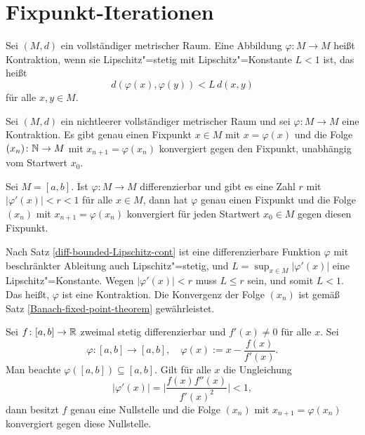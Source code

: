 \newpage
\section{Fixpunkt-Iterationen}%

\begin{Definition}[Kontraktion]
Sei $(M,d)$ ein vollständiger metrischer Raum. Eine Abbildung
$\varphi\colon M\to M$ heißt Kontraktion, wenn sie
Lipschitz"=stetig mit Lipschitz"=Konstante $L<1$ ist, das heißt
\[d(\varphi(x),\varphi(y))<L\,d(x,y)\]
für alle $x,y\in M$.
\end{Definition}

\begin{Satz}\label{Banach-fixed-point-theorem}%
Sei $(M,d)$ ein nichtleerer vollständiger metrischer Raum
und sei $\varphi\colon M\to M$ eine Kontraktion. Es gibt genau
einen Fixpunkt $x\in M$ mit $x=\varphi(x)$ und die Folge
$(x_n)\colon\mathbb N\to M$ mit $x_{n+1}=\varphi(x_n)$ konvergiert
gegen den Fixpunkt, unabhängig vom Startwert $x_0$.
\end{Satz}

\begin{Satz}\label{diff-fixed-point-iter}
Sei $M=[a,b]$. Ist $\varphi\colon M\to M$ differenzierbar und gibt es
eine Zahl $r$ mit $|\varphi'(x)|<r<1$ für alle $x\in M$, dann
hat $\varphi$ genau einen Fixpunkt und die Folge $(x_n)$ mit $x_{n+1}=\varphi(x_n)$
konvergiert für jeden Startwert $x_0\in M$ gegen diesen Fixpunkt.
\end{Satz}
\begin{Beweis}
Nach Satz \ref{diff-bounded-Lipschitz-cont} ist eine differenzierbare
Funktion $\varphi$ mit beschränkter Ableitung auch Lipschitz"=stetig,
und $L=\sup_{x\in M}|\varphi'(x)|$ eine Lipschitz"=Konstante.
Wegen $|\varphi'(x)|<r$ muss $L\le r$ sein, und somit $L<1$.
Das heißt, $\varphi$ ist eine Kontraktion. Die Konvergenz der Folge
$(x_n)$ ist gemäß Satz \ref{Banach-fixed-point-theorem}
gewährleistet.\;\qedsymbol
\end{Beweis}

\begin{Satz}%
\newlinefirst
Sei $f\colon [a,b]\to\mathbb R$ zweimal stetig differenzierbar und
$f'(x)\ne 0$ für alle $x$. Sei%
\[\varphi\colon [a,b]\to [a,b],\quad \varphi(x):=x-\frac{f(x)}{f'(x)}.\]
Man beachte $\varphi([a,b])\subseteq [a,b]$. Gilt für alle $x$ die Ungleichung%
\[|\varphi'(x)| = \bigg|\frac{f(x)f''(x)}{f'(x)^2}\bigg| < 1,\]
dann besitzt $f$ genau eine Nullstelle und die Folge $(x_n)$ mit
$x_{n+1}=\varphi(x_n)$ konvergiert gegen diese Nullstelle.
\end{Satz}

